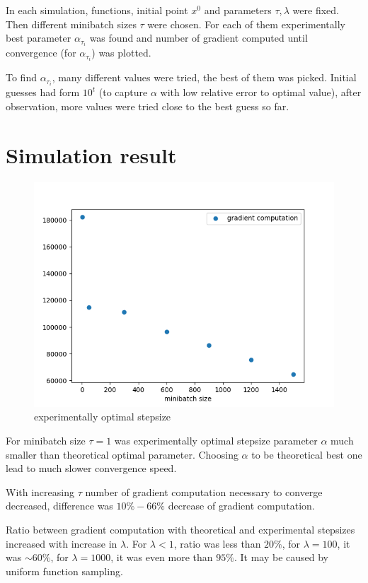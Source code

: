 \documentclass[11pt]{book}
\begin{document}
In each simulation, functions, initial point $x^0$ and parameters $\tau, \lambda$ were fixed. Then different minibatch sizes $\tau$ were chosen. For each of them experimentally best parameter $\alpha_{\tau_i}$ was found and number of gradient computed until convergence (for $\alpha_{\tau_i}$) was plotted. 

To find $\alpha_{\tau_i}$, many different values were tried, the best of them was picked. Initial guesses had form $10^t$ (to capture $\alpha$ with low relative error to optimal value), after observation, more values were tried close to the best guess so far.\\

\section{Simulation result}

\begin{figure}[H]
	\centering
	\includegraphics[width=.7\linewidth]{optimal_stepsize.png}
	\caption{experimentally optimal stepsize}
	\label{fig:optimal stepsize}
\end{figure}



For minibatch size $\tau=1$ was experimentally optimal stepsize parameter $\alpha$ much smaller than theoretical optimal parameter. Choosing $\alpha$ to be theoretical best one lead to much slower convergence speed.

With increasing $\tau$ number of gradient computation necessary to converge decreased, difference was $10\% - 66\%$ decrease of gradient computation.

Ratio between gradient computation with theoretical and experimental stepsizes increased with increase in $\lambda$. For $\lambda <1$, ratio was less than $20\%$, for $\lambda=100$, it was $\sim 60\%$, for $\lambda=1000$, it was even more than $95\%$. It may be caused by uniform function sampling.\\
\end{document}
